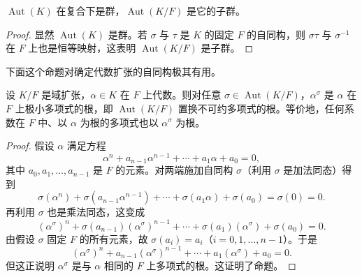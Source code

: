 \begin{proposition}\label{pro:14.1}
\(\operatorname{Aut}(K)\) 在复合下是群，\(\operatorname{Aut}(K/F)\) 是它的子群。
\end{proposition}

\begin{proof}
显然 \(\operatorname{Aut}(K)\) 是群。若 \(\sigma\) 与 \(\tau\) 是 \(K\) 的固定 \(F\) 的自同构，则 \(\sigma\tau\) 与 \(\sigma^{-1}\) 在 \(F\) 上也是恒等映射，这表明 \(\operatorname{Aut}(K/F)\) 是子群。
\end{proof}

下面这个命题对确定代数扩张的自同构极其有用。

\begin{proposition}\label{pro:14.2}
设 \(K/F\) 是域扩张，\(\alpha \in K\) 在 \(F\) 上代数。则对任意 \(\sigma \in \operatorname{Aut}(K/F)\)，\(\alpha^\sigma\) 是 \(\alpha\) 在 \(F\) 上极小多项式的根，即 \(\operatorname{Aut}(K/F)\) 置换不可约多项式的根。等价地，任何系数在 \(F\) 中、以 \(\alpha\) 为根的多项式也以 \(\alpha^\sigma\) 为根。
\end{proposition}

\begin{proof}
假设 \(\alpha\) 满足方程
\[
\alpha^n+a_{n-1}\alpha^{n-1}+\cdots+a_1\alpha+a_0 = 0,
\]
其中 \(a_0, a_1, \ldots, a_{n-1}\) 是 \(F\) 的元素。对两端施加自同构 \(\sigma\)（利用 \(\sigma\) 是加法同态）得到
\[
\sigma(\alpha^n)+\sigma(a_{n-1}\alpha^{n-1})+\cdots+\sigma(a_1\alpha)+\sigma(a_0) = \sigma(0) = 0.
\]
再利用 \(\sigma\) 也是乘法同态，这变成
\[
(\alpha^\sigma)^n+\sigma(a_{n-1})(\alpha^\sigma)^{n-1}+\cdots+\sigma(a_1)(\alpha^\sigma)+\sigma(a_0) = 0.
\]
由假设 \(\sigma\) 固定 \(F\) 的所有元素，故 \(\sigma(a_i) = a_i\)（\(i = 0, 1, \ldots, n-1\)）。于是
\[
(\alpha^\sigma)^n+a_{n-1}(\alpha^\sigma)^{n-1}+\cdots+a_1(\alpha^\sigma)+a_0 = 0.
\]
但这正说明 \(\alpha^\sigma\) 是与 \(\alpha\) 相同的 \(F\) 上多项式的根。这证明了命题。
\end{proof}

